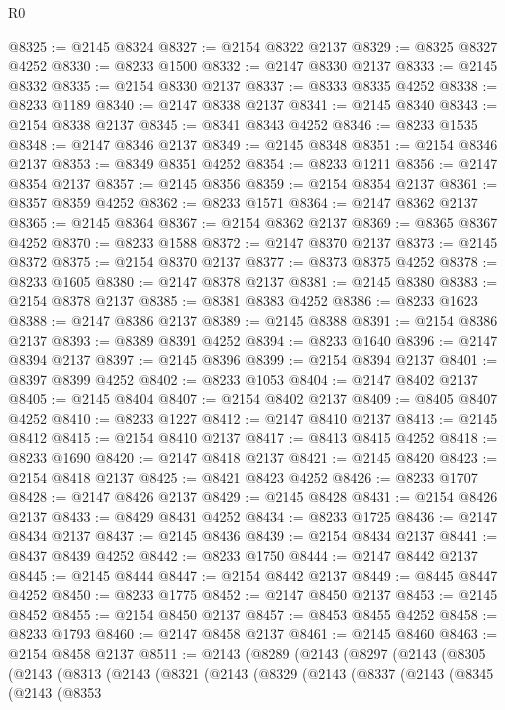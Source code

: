 \begin{lexlean}{R0}
\begin{coremodule}
@8325 := @2145 @8324
@8327 := @2154 @8322 @2137
@8329 := @8325 @8327 @4252
@8330 := @8233 @1500
@8332 := @2147 @8330 @2137
@8333 := @2145 @8332
@8335 := @2154 @8330 @2137
@8337 := @8333 @8335 @4252
@8338 := @8233 @1189
@8340 := @2147 @8338 @2137
@8341 := @2145 @8340
@8343 := @2154 @8338 @2137
@8345 := @8341 @8343 @4252
@8346 := @8233 @1535
@8348 := @2147 @8346 @2137
@8349 := @2145 @8348
@8351 := @2154 @8346 @2137
@8353 := @8349 @8351 @4252
@8354 := @8233 @1211
@8356 := @2147 @8354 @2137
@8357 := @2145 @8356
@8359 := @2154 @8354 @2137
@8361 := @8357 @8359 @4252
@8362 := @8233 @1571
@8364 := @2147 @8362 @2137
@8365 := @2145 @8364
@8367 := @2154 @8362 @2137
@8369 := @8365 @8367 @4252
@8370 := @8233 @1588
@8372 := @2147 @8370 @2137
@8373 := @2145 @8372
@8375 := @2154 @8370 @2137
@8377 := @8373 @8375 @4252
@8378 := @8233 @1605
@8380 := @2147 @8378 @2137
@8381 := @2145 @8380
@8383 := @2154 @8378 @2137
@8385 := @8381 @8383 @4252
@8386 := @8233 @1623
@8388 := @2147 @8386 @2137
@8389 := @2145 @8388
@8391 := @2154 @8386 @2137
@8393 := @8389 @8391 @4252
@8394 := @8233 @1640
@8396 := @2147 @8394 @2137
@8397 := @2145 @8396
@8399 := @2154 @8394 @2137
@8401 := @8397 @8399 @4252
@8402 := @8233 @1053
@8404 := @2147 @8402 @2137
@8405 := @2145 @8404
@8407 := @2154 @8402 @2137
@8409 := @8405 @8407 @4252
@8410 := @8233 @1227
@8412 := @2147 @8410 @2137
@8413 := @2145 @8412
@8415 := @2154 @8410 @2137
@8417 := @8413 @8415 @4252
@8418 := @8233 @1690
@8420 := @2147 @8418 @2137
@8421 := @2145 @8420
@8423 := @2154 @8418 @2137
@8425 := @8421 @8423 @4252
@8426 := @8233 @1707
@8428 := @2147 @8426 @2137
@8429 := @2145 @8428
@8431 := @2154 @8426 @2137
@8433 := @8429 @8431 @4252
@8434 := @8233 @1725
@8436 := @2147 @8434 @2137
@8437 := @2145 @8436
@8439 := @2154 @8434 @2137
@8441 := @8437 @8439 @4252
@8442 := @8233 @1750
@8444 := @2147 @8442 @2137
@8445 := @2145 @8444
@8447 := @2154 @8442 @2137
@8449 := @8445 @8447 @4252
@8450 := @8233 @1775
@8452 := @2147 @8450 @2137
@8453 := @2145 @8452
@8455 := @2154 @8450 @2137
@8457 := @8453 @8455 @4252
@8458 := @8233 @1793
@8460 := @2147 @8458 @2137
@8461 := @2145 @8460
@8463 := @2154 @8458 @2137
@8511 := @2143
    (@8289
      (@2143
        (@8297
          (@2143
            (@8305
              (@2143
                (@8313
                  (@2143
                    (@8321
                      (@2143
                        (@8329
                          (@2143
                            (@8337
                              (@2143
                                (@8345
                                  (@2143
                                    (@8353

\end{coremodule}
\end{lexlean}

